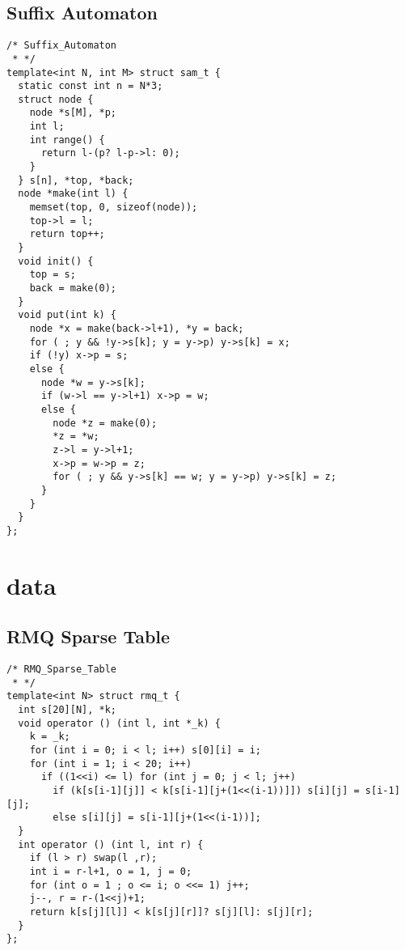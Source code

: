 \subsection{Suffix Automaton}
\begin{lstlisting}
/* Suffix_Automaton
 * */
template<int N, int M> struct sam_t {
  static const int n = N*3;
  struct node {
    node *s[M], *p;
    int l;
    int range() {
      return l-(p? l-p->l: 0);
    }
  } s[n], *top, *back;
  node *make(int l) {
    memset(top, 0, sizeof(node));
    top->l = l;
    return top++;
  }
  void init() {
    top = s;
    back = make(0);
  }
  void put(int k) {
    node *x = make(back->l+1), *y = back;
    for ( ; y && !y->s[k]; y = y->p) y->s[k] = x;
    if (!y) x->p = s;
    else {
      node *w = y->s[k];
      if (w->l == y->l+1) x->p = w;
      else {
        node *z = make(0);
        *z = *w;
        z->l = y->l+1;
        x->p = w->p = z;
        for ( ; y && y->s[k] == w; y = y->p) y->s[k] = z;
      }
    }
  }
};
\end{lstlisting}


\section{data}

\subsection{RMQ Sparse Table}
\begin{lstlisting}
/* RMQ_Sparse_Table
 * */
template<int N> struct rmq_t {
  int s[20][N], *k;
  void operator () (int l, int *_k) {
    k = _k;
    for (int i = 0; i < l; i++) s[0][i] = i;
    for (int i = 1; i < 20; i++)
      if ((1<<i) <= l) for (int j = 0; j < l; j++)
        if (k[s[i-1][j]] < k[s[i-1][j+(1<<(i-1))]]) s[i][j] = s[i-1][j];
        else s[i][j] = s[i-1][j+(1<<(i-1))];
  }
  int operator () (int l, int r) {
    if (l > r) swap(l ,r);
    int i = r-l+1, o = 1, j = 0;
    for (int o = 1 ; o <= i; o <<= 1) j++;
    j--, r = r-(1<<j)+1;
    return k[s[j][l]] < k[s[j][r]]? s[j][l]: s[j][r];
  }
};
\end{lstlisting}


